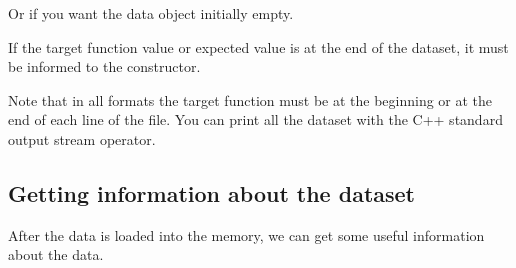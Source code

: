 \documentclass[letterpaper,10pt,english]{sphinxmanual}
\begin{document}
\begin{sphinxVerbatim}[commandchars=\\\{\}]
 
\end{sphinxVerbatim}

\sphinxAtStartPar
Or if you want the data object initially empty.

\begin{sphinxVerbatim}[commandchars=\\\{\}]
 

\end{sphinxVerbatim}

\sphinxAtStartPar
If the target function value or expected value is at the end of the dataset, it must be informed to the constructor.

\begin{sphinxVerbatim}[commandchars=\\\{\}]
  
\end{sphinxVerbatim}

\sphinxAtStartPar
Note that in all formats the target function must be at the beginning or at the end of each line of the file. You can print
all the dataset with the C++ standard output stream operator.

\begin{sphinxVerbatim}[commandchars=\\\{\}]
 

    
\end{sphinxVerbatim}


\subsection{Getting information about the dataset}
\label{\detokenize{getting_started/datamanagement:getting-information-about-the-dataset}}\label{\detokenize{getting_started/datamanagement:datasetinformation}}
\sphinxAtStartPar
After the data is loaded into the memory, we can get some useful information about the data.
\end{document}
